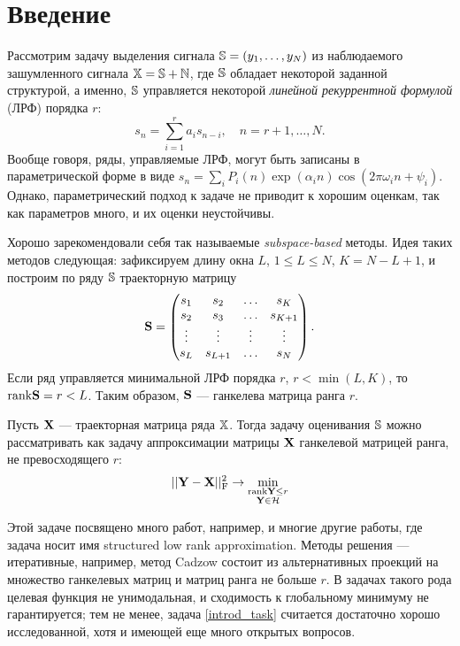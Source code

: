 \documentclass[12pt,a4paper,fleqn,leqno]{article}
\begin{document}
\section{Введение}
Рассмотрим задачу выделения сигнала $\mathbb{S} = (y_1, \ldots, y_N)$ из наблюдаемого зашумленного сигнала $\mathbb{X} = \mathbb{S} + \mathbb{N}$, где $\mathbb{S}$  обладает некоторой заданной структурой, а именно, $\mathbb{S}$ управляется некоторой \emph{линейной рекуррентной формулой} (ЛРФ) порядка $r$:
\begin{equation*}
s_n = \sum_{i = 1}^{r} a_i s_{n-i}, \quad n = r + 1, \ldots, N.
\end{equation*}
Вообще говоря, ряды, управляемые ЛРФ, могут быть записаны в параметрической форме в виде $s_n = \sum_i P_i(n) \exp(\alpha_i n) \cos(2 \pi \omega_i n + \psi_i)$. Однако, параметрический подход к задаче не приводит к хорошим оценкам, так как параметров много, и их оценки неустойчивы.

Хорошо зарекомендовали себя так называемые \emph{subspace-based} методы. Идея таких методов следующая: зафиксируем длину окна $L$, $1 \le L \le N$, $K = N - L + 1$, и построим по ряду $\mathbb{S}$ траекторную матрицу
\begin{equation*}
\mathbf{S} = \begin{pmatrix}
s_1 & s_2 & \ldots & s_K \\
s_2 & s_3 & \ldots & s_{K + 1} \\
\vdots & \vdots & \vdots & \vdots \\
s_L & s_{L + 1} & \ldots & s_N
\end{pmatrix}.
\end{equation*}
Если ряд управляется минимальной ЛРФ порядка $r$, $r < \min(L, K)$, то $\text{rank} \mathbf{S} = r < L$. Таким образом, $\mathbf{S}$ --- ганкелева матрица ранга $r$.

Пусть $\mathbf{X}$ --- траекторная матрица ряда $\mathbb{X}$. Тогда задачу оценивания $\mathbb{S}$ можно рассматривать как задачу аппроксимации матрицы $\mathbf{X}$ ганкелевой матрицей ранга, не превосходящего $r$:
\begin{equation}\label{introd_task}
||\mathbf{Y} - \mathbf{X}||^2_{\mathrm{F}} \to \min_{\substack{\text{rank} \mathbf{Y} \le r \\ \mathbf{Y} \in \mathcal{H}}}
\end{equation}

Этой задаче посвящено много работ, например, \cite{Cadzow1988, Markovsky2011, Usevich.Markovsky2014, Gillard2014} и многие другие работы, где задача носит имя 
structured low rank approximation. Методы решения --- итеративные, например, метод Cadzow состоит из альтернативных проекций на множество ганкелевых матриц и матриц ранга не больше $r$. В задачах такого рода целевая функция не унимодальная, и сходимость к глобальному минимуму не гарантируется; тем не менее, задача \eqref{introd_task} считается достаточно хорошо исследованной, хотя и имеющей еще много открытых вопросов.
\end{document}
